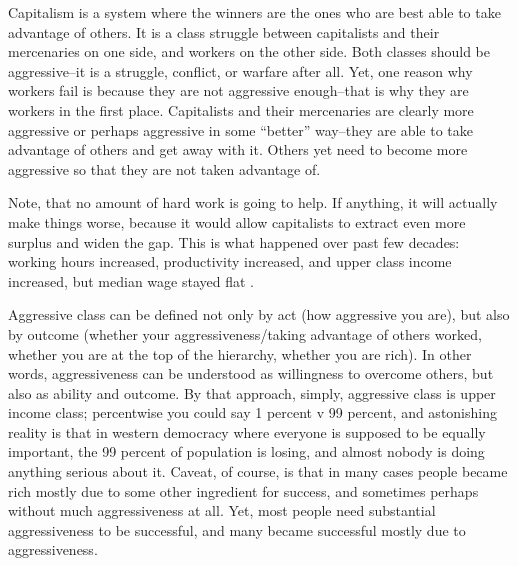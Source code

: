 \documentclass[11pt, letterpaper]{article}
\begin{document}
\begin{spacing}{2.0}


Capitalism is a system where the winners are the ones who are best able to take advantage of others.
It is a class struggle  between capitalists and their mercenaries on one side,
and workers on the other side. Both
classes should be aggressive--it is a struggle, conflict, or
warfare after all. Yet, one reason why workers fail is because they are not
aggressive enough--that is why they are workers in the first place.
Capitalists and their mercenaries are clearly more aggressive
or perhaps aggressive in some ``better'' way--they are able to take advantage of
others and get away with it. Others yet need to become more aggressive so that
they are not taken advantage of.

Note, that no amount of hard work is going to
help. If anything, it will actually make things worse, because it would allow
capitalists to extract even more surplus and widen the gap. This is what
happened over past few decades: working hours increased,  
 productivity increased, and upper class income increased,
but median wage stayed flat \citep{aokditella,aok_ruut_inc_ine}.

Aggressive class can be defined not only by act (how aggressive you are), but also
by outcome (whether your aggressiveness/taking advantage of others worked, whether
you are at the top of the hierarchy, whether you are rich). 
In other words, aggressiveness can be understood as willingness to overcome
others, but also as ability and outcome. %
By that approach, simply, aggressive class is upper income class; percentwise you could say 1 percent v 99
percent, and astonishing reality is that in western  democracy where everyone is
supposed to be equally important, the 99 percent of population is losing, and
almost nobody is doing anything serious about it. Caveat, of course, is that in
many cases people became rich mostly due to some other ingredient for success, and
sometimes perhaps without much aggressiveness at all. Yet, most people need
substantial aggressiveness to be successful, and many became successful mostly due to aggressiveness.


\end{spacing}
\end{document}
